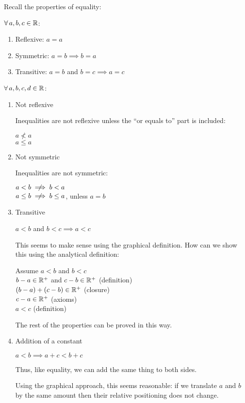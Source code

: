 \documentclass[letterpaper,12pt,fleqn]{article}
\newcommand{\Rp}{\R^+}
\begin{document}
Recall the properties of equality:
\begin{properties}
  $\forall\,a,b,c\in\mathbb{R}$:
  \begin{enumerate}
  \item Reflexive: $a=a$
  \item Symmetric: $a=b\implies b=a$
  \item Transitive: $a=b$ and $b=c\implies a=c$
  \end{enumerate}
\end{properties}
\newpage
\begin{properties}
  $\forall\,a,b,c,d\in\mathbb{R}$:
  \begin{enumerate}
  \item Not reflexive

    Inequalities are not reflexive unless the ``or equals to'' part is
    included:
    
    $a\not<a$ \\
    $a\le a$

  \item Not symmetric
  
    Inequalities are not symmetric:

    $a<b\centernot\implies b<a$ \\
    $a\le b\centernot\implies b\le a$, unless $a=b$ \\

  \item Transitive

    $a<b$ and $b<c\implies a<c$

    This seems to make sense using the graphical definition. How can we show
    this using the analytical definition:

    Assume $a<b$ and $b<c$ \\
    $b-a\in\Rp$ and $c-b\in\Rp$ (definition) \\
    $(b-a)+(c-b)\in\Rp$ (closure) \\
    $c-a\in\Rp$ (axioms) \\
    $a<c$ (definition)

    The rest of the properties can be proved in this way.

  \item Addition of a constant

    $a<b\implies a+c<b+c$

    Thus, like equality, we can add the same thing to both sides.

    Using the graphical approach, this seems reasonable: if we translate $a$ and
    $b$ by the same amount then their relative positioning does not change.


\end{enumerate}
\end{properties}
\end{document}
